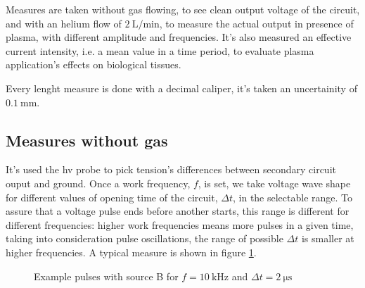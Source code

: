 Measures are taken without gas flowing, to see clean output voltage of the circuit, and with an helium flow of $\SI{2}{\liter/\minute}$, to measure the actual output in presence of plasma, with different amplitude and frequencies. It's also measured an effective current intensity, i.e. a mean value in a time period, to evaluate plasma application's effects on biological tissues.

Every lenght measure is done with a decimal caliper, it's taken an uncertainity of $\SI{0.1}{\milli\meter}$.

\subsection{Measures without gas}
It's used the hv probe to pick tension's differences between secondary circuit ouput and ground.
Once a work frequency, $f$, is set, we take voltage wave shape for different values of opening time of the circuit, $\Delta t$, in the selectable range.
To assure that a voltage pulse ends before another starts, this range is different for different frequencies: higher work frequencies means more pulses in a given time, taking into consideration pulse oscillations, the range of possible $\Delta t$ is smaller at higher frequencies.
A typical measure is shown in figure \ref{fig:tensionpeak}.
\begin{figure}
 \centering
 \hfill
 \caption{Example pulses with source B for $f = \SI{10}{\kilo\hertz}$ and $\Delta t = \SI{2}{\micro\second}$}
 \label{fig:tensionpeak}
\end{figure}

